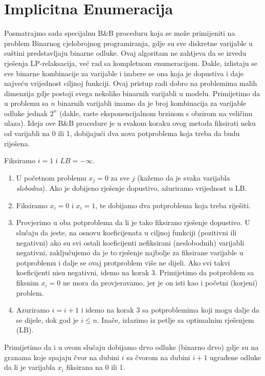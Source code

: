\documentclass[a4paper, utf8, 11pt, colorlinks]{book}
\begin{document}
\section{Implicitna Enumeracija}
Posmatrajmo sada specijalnu B\&B proceduru koja se može primijeniti na problem Binarnog cjelobrojnog programiranja, gdje su sve diskretne varijable u suštini predstavljaju binarne odluke. Ovaj algoritam ne zahtjeva da se izvedu rješenja LP-relaksacija, već rad sa kompletnom enumeracijom. Dakle, izlistaju se sve binarne kombinacije za varijable i izabere se ona koja je dopustiva i daje najveću vrijednost ciljnoj funkciji. Ovaj pristup radi dobro na problemima malih dimenzija gdje postoji svega nekoliko binarnih varijabli u modelu. Primijetimo da u problemu sa $n$ binarnih varijabli imamo da je broj kombinacija za varijable odluke jednak $2^n$ (dakle, raste eksponencijalnom brzinom s obzirom na veličinu ulaza). Ideja ove B\&B procedure je u svakom koraku ovog metoda fiksirati neku od varijabli na 0 ili 1, dobijajući dva nova potproblema koja treba da budu riješena. 

Fiksiramo $i=1$ i $LB=-\infty$. 

\begin{enumerate}
    \item U početnom problemu  $x_j=0$ za sve $j$ (kažemo da je svaka varijabla \emph{slobodna}). Ako je dobijeno rješenje dopustivo, ažuriramo vrijednost u LB.
    \item Fiksiramo $x_i=0$  i $x_i=1$, te dobijamo dva potproblema koja treba riješiti.
    \item  Provjerimo u oba potproblema da li je tako fiksirano rješenje dopustivo. U slučaju da jeste, na osnovu koeficijenata u ciljnoj funkciji (pozitivni ili negativni) ako su svi  ostali koeficijenti nefiksirani (neslobodnih) varijabli negativni, zaključujemo da je to rješenje najbolje za fiksirane varijable u potproblemu i dalje se ovaj protproblem više ne dijeli. Ako svi takvi koeficijenti nisu negativni, idemo na korak 3. Primijetimo da   potproblem sa fiksnim $x_i=0$ ne mora da provjeravamo, jer je on isti kao i početni (korjeni) problem.
    \item Azuriramo $i = i+1$ i idemo na korak 3 sa potproblemima koji mogu dalje da se dijele, dok god je $i \leq n$. Inače, izlazimo iz petlje sa optimalnim rješenjem (LB). 
\end{enumerate}
 Primijetimo da i u ovom slučaju dobijamo drvo odluke (binarno drvo) gdje su na granama koje spajaju čvor na dubini $i$ sa čvorom na dubini $i+1$  ugrađene odluke da li je varijabla $x_i$ fiksirana na 0 ili 1.
\end{document}
